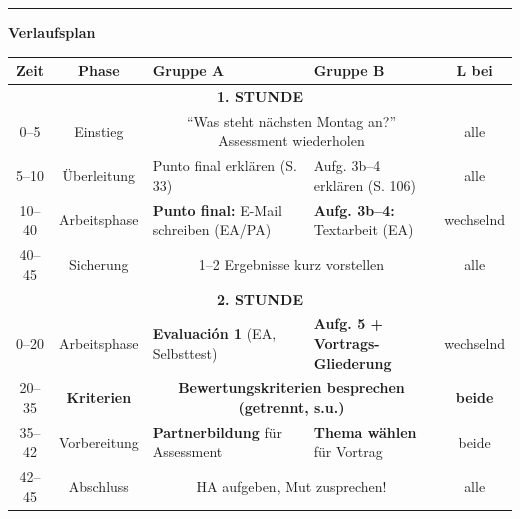 \documentclass[11pt, a4paper]{article}
\begin{document}
\vspace{0.2cm}
\hrule
\vspace{0.2cm}


\textbf{\large Verlaufsplan}

\vspace{0.2cm}

\footnotesize
\begin{tabularx}{\textwidth}{|c|c|X|X|c|}
\hline
\rowcolor{spanisch!20}
\textbf{Zeit} & \textbf{Phase} & \textbf{Gruppe A} & \textbf{Gruppe B} & \textbf{L bei} \\
\hline
\multicolumn{5}{|c|}{\cellcolor{hellgrau}\textbf{1. STUNDE}} \\
\hline
0--5 & Einstieg & \multicolumn{2}{c|}{``Was steht nächsten Montag an?'' Assessment wiederholen} & alle \\
\hline
5--10 & Überleitung & Punto final erklären (S. 33) & Aufg. 3b--4 erklären (S. 106) & alle \\
\hline
10--40 & Arbeitsphase & \textbf{Punto final:} E-Mail schreiben (EA/PA) & \textbf{Aufg. 3b--4:} Textarbeit (EA) & wechselnd \\
\hline
40--45 & Sicherung & \multicolumn{2}{c|}{1--2 Ergebnisse kurz vorstellen} & alle \\
\hline
\multicolumn{5}{|c|}{\cellcolor{hellgrau}\textbf{2. STUNDE}} \\
\hline
0--20 & Arbeitsphase & \textbf{Evaluación 1} (EA, Selbsttest) & \textbf{Aufg. 5 + Vortrags-Gliederung} & wechselnd \\
\hline
\rowcolor{wichtig!20}
20--35 & \textbf{Kriterien} & \multicolumn{2}{c|}{\textbf{Bewertungskriterien besprechen (getrennt, s.u.)}} & \textbf{beide} \\
\hline
35--42 & Vorbereitung & \textbf{Partnerbildung} für Assessment & \textbf{Thema wählen} für Vortrag & beide \\
\hline
42--45 & Abschluss & \multicolumn{2}{c|}{HA aufgeben, Mut zusprechen!} & alle \\
\hline
\end{tabularx}

\normalsize
\vspace{0.2cm}

\end{document}
